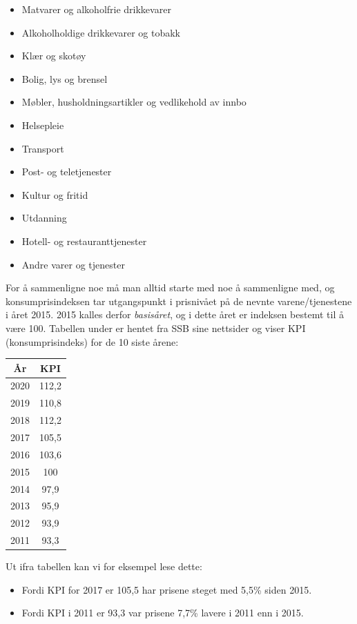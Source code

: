 \parbox[t]{0.49\linewidth}{\begin{itemize}
		\item Matvarer og alkoholfrie drikkevarer
		\item Alkoholholdige drikkevarer og tobakk
		\item Klær og skotøy
		\item Bolig, lys og brensel
		\item Møbler, husholdningsartikler og vedlikehold av innbo
		\item Helsepleie
\end{itemize}}
\parbox[t]{0.49\linewidth}{\begin{itemize}
		\item Transport
		\item Post- og teletjenester
		\item Kultur og fritid
		\item Utdanning
		\item Hotell- og restauranttjenester
		\item Andre varer og tjenester
\end{itemize}}
For å sammenligne noe må man alltid starte med noe å sammenligne med, og konsumprisindeksen tar utgangspunkt i prisnivået på de nevnte varene/tjenestene i året 2015. 2015 kalles derfor \textit{basisåret}, og i dette året er indeksen bestemt til å være 100.\regv
{}\regv
Tabellen under er hentet fra SSB sine nettsider og viser KPI (konsumprisindeks) for de 10 siste årene:
\begin{center}
	\begin{tabular}{c|c}
		År &  KPI \\ \hline
		2020 & 112,2\\
		2019 & 	110,8\\
		2018 &  112,2 \\
		2017&	105,5\\
		2016&	103,6\\
		2015&	100\\
		2014&	97,9\\
		2013&	95,9\\
		2012&	93,9\\
		2011&	93,3\\
	\end{tabular}
\end{center}
Ut ifra tabellen kan vi for eksempel lese dette:
\begin{itemize}
	\item Fordi KPI for 2017 er 105,5 har prisene steget med 5,5\% siden 2015.
	\item Fordi KPI i 2011 er 93,3 var prisene 7,7\% lavere i 2011 enn i 2015.
\end{itemize}
